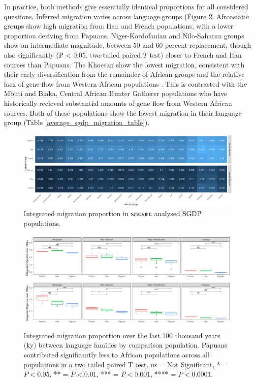 \documentclass{article}
\begin{document}
In practice, both methods give essentially identical proportions for all considered questions. Inferred migration varies across language groups (Figure \ref{averages_of_sgdp}. Afroasiatic groups show high migration from Han and French populations, with a lower proportion deriving from Papuans. Niger-Kordofanian and Nilo-Saharan groups show an intermediate magnitude, between 50 and 60 percent replacement, though also significantly (P < 0.05, two-tailed paired $T$ test) closer to French and Han sources than Papuans. The Khoesan show the lowest migration, consistent with their early diversification from the remainder of African groups and the relative lack of gene-flow from Western African populations \cite{Lipson2019}. This is contrasted with the Mbuti and Biaka, Central African Hunter Gatherer populations who have historically recieved substantial amounts of gene flow from Western African sources. Both of these populations show the lowest migration in their language group (Table \ref{average_sgdp_migration_table}). 

\begin{figure}
	\centering
	\includegraphics[width=\textwidth]{../plot/mig/integrated_sgdp.pdf}
	\caption{Integrated migration proportion in {\tt smcsmc} analysed SGDP populations.}
	\label{sgdp_heatmap}
\end{figure}

\begin{figure}
	\centering
	\includegraphics[width=\textwidth]{../plot/mig/sgdp_averages.pdf}
	\caption{Integrated migration proportion over the last 100 thousand years (ky) between language families by comparison population. Papuans contributed significantly less to African populations across all populations in a two tailed paired T test. ns = Not Significant, * = $P<0.05$, ** = $P<0.01$, *** = $P<0.001$, **** = $P<0.0001$.}
	\label{averages_of_sgdp}
\end{figure}
\end{document}
